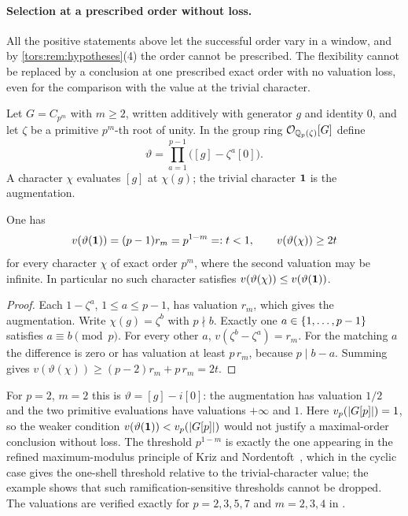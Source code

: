 \paragraph{Selection at a prescribed order without loss.}
All the positive statements above let the successful order vary in a window, and by
\cref{tors:rem:hypotheses}(4) the order cannot be prescribed. The flexibility cannot be
replaced by a conclusion at one prescribed exact order with no valuation loss, even for the
comparison with the value at the trivial character.

Let $G=C_{p^m}$ with $m\ge2$, written additively with generator $g$ and identity $0$, and
let $\zeta$ be a primitive $p^m$-th root of unity. In the group ring
$\mathcal{O}_{\mathbb{Q}_p(\zeta)}[G]$ define
\[
 \vartheta=\prod_{a=1}^{p-1}\bigl([g]-\zeta^a[0]\bigr).
\]
A character $\chi$ evaluates $[g]$ at $\chi(g)$; the trivial character $\mathbf{1}$ is the
augmentation.

\begin{proposition}\label{cost:prop:maxorder}
One has
\[
 v(\vartheta(\mathbf{1}))=(p-1)r_m=p^{1-m}=:t<1,\qquad v(\vartheta(\chi))\ge2t
\]
for every character $\chi$ of exact order $p^m$, where the second valuation may be
infinite. In particular no such character satisfies
$v(\vartheta(\chi))\le v(\vartheta(\mathbf{1}))$.
\end{proposition}

\begin{proof}
Each $1-\zeta^a$, $1\le a\le p-1$, has valuation $r_m$, which gives the augmentation. Write
$\chi(g)=\zeta^b$ with $p\nmid b$. Exactly one $a\in\{1,\ldots,p-1\}$ satisfies
$a\equiv b\pmod p$. For every other $a$, $v(\zeta^b-\zeta^a)=r_m$. For the matching $a$ the
difference is zero or has valuation at least $p\,r_m$, because $p\mid b-a$. Summing gives
$v(\vartheta(\chi))\ge(p-2)r_m+p\,r_m=2t$.
\end{proof}

For $p=2$, $m=2$ this is $\vartheta=[g]-i[0]$: the augmentation has valuation $1/2$ and the
two primitive evaluations have valuations $+\infty$ and $1$. Here
$v_p(\lvert G[p]\rvert)=1$, so the weaker condition $v(\vartheta(\mathbf{1}))<v_p(\lvert G[p]\rvert)$ would not
justify a maximal-order conclusion without loss. The threshold $p^{1-m}$ is exactly the one
appearing in the refined maximum-modulus principle of Kriz and
Nordentoft~\cite[Proposition~2.11]{KrizNordentoft2023Horizontal}, which in the cyclic case
gives the one-shell threshold relative to the trivial-character value; the example shows
that such ramification-sensitive thresholds cannot be dropped. The valuations are verified
exactly for $p=2,3,5,7$ and $m=2,3,4$ in
.

